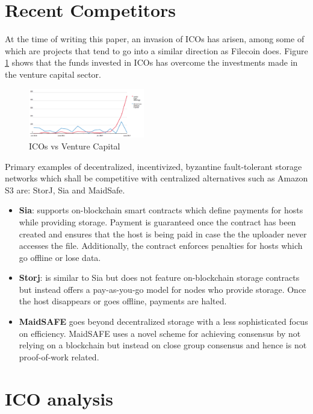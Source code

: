 \documentclass[journal]{IEEEtran}
\begin{document}
\section{Recent Competitors}
\label{sec:recent-competitors}
At the time of writing this paper, an invasion of ICOs has arisen, among some of which are projects that tend to go into a similar direction as Filecoin does.
Figure \ref{fig:ico-vs-venture} shows that the funds invested in ICOs has overcome the investments made in the venture capital sector.
\begin{figure}[h]
\centering
\includegraphics[width=0.45\textwidth]{ico-vs-venture}
\caption{ICOs vs Venture Capital \cite{ico-vs-venture}}
\label{fig:ico-vs-venture}
\end{figure}
Primary examples of decentralized, incentivized, byzantine fault-tolerant storage networks which shall be competitive with centralized alternatives such as Amazon S3\cite{amazon-s3} are: StorJ\cite{storj}, Sia\cite{sia} and MaidSafe\cite{maidsafe}.
\begin{itemize}
\item \textbf{Sia}: supports on-blockchain smart contracts which define payments for hosts while providing storage. 
Payment is guaranteed once the contract has been created and ensures that the host is being paid in case the the uploader never accesses the file. 
Additionally, the contract enforces penalties for hosts which go offline or lose data.
\item \textbf{Storj}: is similar to Sia but does not feature on-blockchain storage contracts but instead offers a pay-as-you-go model for nodes who provide storage. 
Once the host disappears or goes offline, payments are halted.
\item \textbf{MaidSAFE} goes beyond decentralized storage with a less sophisticated focus on efficiency.
MaidSAFE uses a novel scheme for achieving consensus by not relying on a blockchain but instead on close group consensus and hence is not proof-of-work related.

\end{itemize}

\section{ICO analysis}
\label{sec:ico-analysis}
\end{document}
